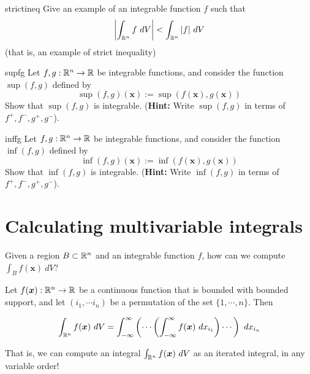 \begin{problem}{strictineq}
    Give an example of an integrable function $f$ such that $$\left|\int_{\mathbb{R}^n} f \ dV\right| < \int_{\mathbb{R}^n} |f| \ dV$$
    (that is, an example of strict inequality)
\end{problem}

\begin{problem}{supfg}
    Let $f,g : \mathbb{R}^n \to \mathbb{R}$ be integrable functions, and consider the function $\sup(f,g)$ defined by $$\sup(f,g)(\bm{x}) := \sup(f(\bm{x}),g(\bm{x}))$$ Show that $\sup(f,g)$ is integrable.
    (\textbf{Hint:} Write $\sup(f,g)$ in terms of $f^+,f^-,g^+,g^-$).
\end{problem}

\begin{problem}{inffg}
    Let $f,g : \mathbb{R}^n \to \mathbb{R}$ be integrable functions, and consider the function $\inf(f,g)$ defined by $$\inf(f,g)(\bm{x}) := \inf(f(\bm{x}),g(\bm{x}))$$ Show that $\inf(f,g)$ is integrable.
    (\textbf{Hint:} Write $\inf(f,g)$ in terms of $f^+,f^-,g^+,g^-$).
\end{problem}



\section{Calculating multivariable integrals}

    \begin{motivating}
        Given a region $B \subset \mathbb{R}^n$ and an integrable function $f$, how can we compute $\int_B f(\bm{x}) \ dV$?
    \end{motivating}

    \begin{theorem}[Fubini]
    Let $f(\bm{x}): \mathbb{R}^n \to \mathbb{R}$ be a continuous function that is bounded with bounded support, and let $(i_1, \cdots i_n)$ be a permutation of the set $\{1, \cdots, n\}$. Then 
    
    $$\int_{\mathbb{R}^n} f(\bm{x}) \ dV = \int_{-\infty}^{\infty} \left( \cdots \left(\int_{-\infty}^{\infty} f(\bm{x}) \ dx_{i_1} \right) \cdots \right) \ dx_{i_n}$$

    \end{theorem}

    That is, we can compute an integral $\int_{\mathbb{R}^n} f(\bm{x}) \ dV$ as an iterated integral, in any variable order!

